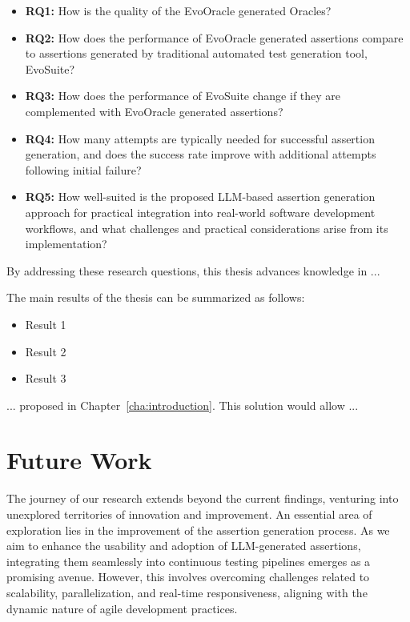 \begin{itemize}
    \item \textbf{RQ1:} How is the quality of the EvoOracle generated Oracles?
    \item \textbf{RQ2:} How does the performance of EvoOracle generated assertions compare to assertions generated by traditional automated test generation tool, EvoSuite?
    \item \textbf{RQ3:} How does the performance of EvoSuite change if they are complemented with EvoOracle generated assertions?
    \item \textbf{RQ4:} How many attempts are typically needed for successful assertion generation, and does the success rate improve with additional attempts following initial failure?
    \item \textbf{RQ5:} How well-suited is the proposed LLM-based assertion generation approach for practical integration into real-world software development workflows, and what challenges and practical considerations arise from its implementation?
\end{itemize}

By addressing these research questions, this thesis advances knowledge in ...

The main results of the thesis can be summarized as follows:
\begin{itemize}
  \item Result 1
  \item Result 2
  \item Result 3
\end{itemize}

... proposed in Chapter~\ref{cha:introduction}. This solution would allow ...

\section{Future Work}
\label{sec:future_work}
\vspace{0.2 cm}

The journey of our research extends beyond the current findings, venturing into unexplored territories of innovation and improvement. An essential area of exploration lies in the improvement of the assertion generation process. As we aim to enhance the usability and adoption of LLM-generated assertions, integrating them seamlessly into continuous testing pipelines emerges as a promising avenue. However, this involves overcoming challenges related to scalability, parallelization, and real-time responsiveness, aligning with the dynamic nature of agile development practices.

